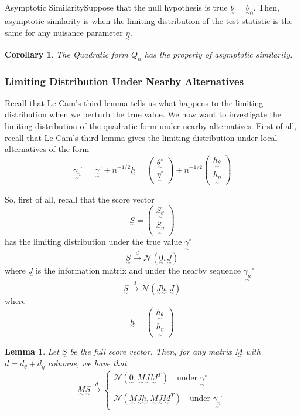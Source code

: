 \documentclass[twoside]{article}
\newtheorem{lemma}[theorem]{Lemma}
\newtheorem{corollary}[theorem]{Corollary}
\newcommand{\utilde}{\underset{\sim}}
\begin{document}
\begin{definition_exam}{Asymptotic Similarity}{}Suppose that the null hypothesis is true $\utilde{\theta} = \utilde{\theta}_0.$ Then, asymptotic similarity is when the limiting distribution of the test statistic is the same for any nuisance parameter $\utilde{\eta}.$
\end{definition_exam}

\begin{corollary}The Quadratic form $Q_n$ has the property of asymptotic similarity.
\end{corollary}

\subsubsection{Limiting Distribution Under Nearby Alternatives}
Recall that Le Cam's third lemma tells us what happens to the limiting distribution when we perturb the true value. We now want to investigate the limiting distribution of the quadratic form under nearby alternatives. First of all, recall that Le Cam's third lemma gives the limiting distribution under local alternatives of the form 
$$
\utilde{\gamma_n}^{\circ} = \utilde{\gamma}^{\circ} + n^{-1/2}\utilde{h} = \begin{pmatrix} \utilde{\theta^{\circ}} \\ \utilde{\eta^{\circ}} \end{pmatrix} + n^{-1/2}\begin{pmatrix} \utilde{h_{\theta}} \\ \utilde{h_{\eta}}
\end{pmatrix}
$$

So, first of all, recall that the score vector 
$$
\utilde{S} = \begin{pmatrix}\utilde{S_{\theta}}\\\utilde{S_{\eta}} \end{pmatrix}
$$
has the limiting distribution under the true value $\utilde{\gamma}^{\circ}$
$$
\utilde{S} \xrightarrow{d} \mathcal{N}(\utilde{0}, \utilde{J})
$$
where $\utilde{J}$ is the information matrix and under the nearby sequence $\utilde{\gamma_n}^{\circ}$
$$
\utilde{S} \xrightarrow{d} \mathcal{N}(\utilde{J}\utilde{h}, \utilde{J})
$$
where 
$$
\utilde{h} = \begin{pmatrix}\utilde{h_{\theta}}\\\utilde{h_{\eta}} \end{pmatrix}
$$

\begin{lemma}Let $\utilde{S}$ be the full score vector. Then, for any matrix $\utilde{M}$ with $d = d_{\theta} + d_{\eta}$ columns, we have that 
$$
\utilde{M}\utilde{S} \xrightarrow{d}
\begin{cases}
\mathcal{N}(\utilde{0}, \utilde{M}\utilde{J}\utilde{M}^T) \quad \text{under } \utilde{\gamma}^{\circ}  \\\\

\mathcal{N}(\utilde{M}\utilde{J}\utilde{h}, \utilde{M}\utilde{J}\utilde{M}^T) \quad \text{under } \utilde{\gamma_n}^{\circ}
\end{cases}
$$
\end{lemma}
\end{document}
